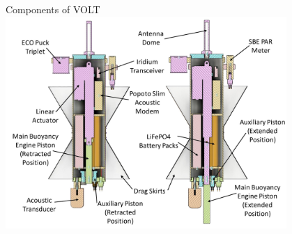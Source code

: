 \begin{frame}{Components of VOLT}
     \centering
     \includegraphics[height=0.8\textheight,width=0.8\textwidth,keepaspectratio]{images/VOLT/volt-sectionview.png}

\end{frame}
